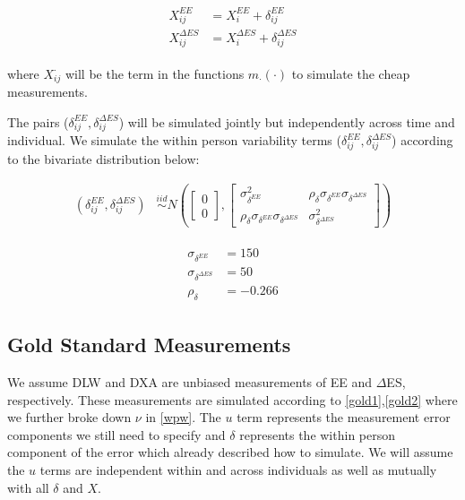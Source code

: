 \documentclass[11pt]{article}\usepackage[]{graphicx}\usepackage[]{color}
\begin{document}
\begin{align}
\begin{split}
\label{wpy}
X_{ij}^{EE} &= X_{i}^{EE} + \delta_{ij}^{EE} \\
X_{ij}^{\Delta ES} &= X_{i}^{\Delta ES} + \delta_{ij}^{\Delta ES}
\end{split}
\end{align} 

where $X_{ij}^{\cdot}$ will be the term in the functions $m_{\cdot}(\cdot)$ to simulate the cheap measurements.

The pairs ($\delta_{ij}^{EE},\delta_{ij}^{\Delta ES}$) will be simulated jointly  but independently across time and individual. We simulate the within person variability terms ($\delta_{ij}^{EE},\delta_{ij}^{\Delta ES}$) according to the bivariate distribution below:


\begin{align}
  \label{delta}
  (\delta_{ij}^{EE}, \delta_{ij}^{\Delta ES}) &\overset{iid}{\sim} N\left(
  \begin{bmatrix}
  0\\
  0
  \end{bmatrix}
  ,
  \begin{bmatrix}
  \sigma_{\delta^{EE}}^2 & \rho_{\delta}\sigma_{\delta^{EE}}\sigma_{\delta^{\Delta ES}} \\
   \rho_{\delta}\sigma_{\delta^{EE}}\sigma_{\delta^{\Delta ES}} & \sigma_{\delta^{\Delta ES}}^2
   \end{bmatrix}
  \right)
\end{align}


  \begin{align}
  \begin{split}
    \label{withinvar5}
  \sigma_{\delta^{EE}} &= 150\\
  \sigma_{\delta^{\Delta ES}} &= 50 \\
  \rho_{\delta} &= -0.266
  \end{split}
  \end{align}


\subsection{Gold Standard Measurements}

We assume DLW and DXA are unbiased measurements of EE and $\Delta$ES, respectively. These measurements are simulated according to \eqref{gold1},\eqref{gold2} where we further broke down $\nu$ in \eqref{wpw}.  The $u$ term represents the measurement error components we still need to specify and $\delta$ represents the within person component of the error which already described how to simulate. We will assume the $u$ terms are independent within and across individuals as well as mutually with all $\delta$ and $X$. 
\end{document}
